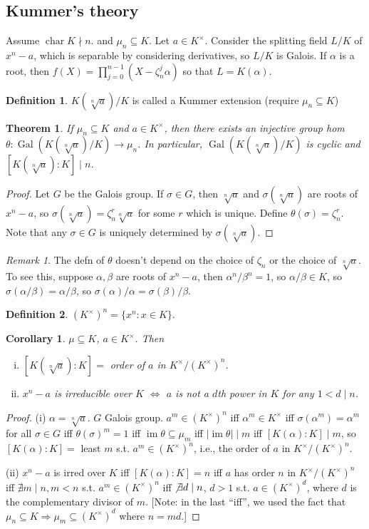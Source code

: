 \documentclass{article}
\theoremstyle{definition}
\newtheorem*{defn*}{Definition}
\theoremstyle{remark}
\newtheorem{rem}{Remark}
\theoremstyle{plain}
\newtheorem{thm}[defn]{Theorem}
\newtheorem{crly}[defn]{Corollary}
\newcommand{\Gal}{\operatorname{Gal}}
\begin{document}
\subsection{Kummer's theory}
Assume $\operatorname{char}K\nmid n$. and $\mu_n\subseteq K$. Let $a\in K^\times$. Consider the splitting field $L/K$ of $x^n-a$, which is separable by considering derivatives, so $L/K$ is Galois. If $\alpha$ is a root, then $f(X)=\prod_{j=0}^{n-1}(X-\zeta_n^j\alpha)$ so that $L=K(\alpha)$.
\begin{defn*}
    $K(\sqrt[n]a)/K$ is called a Kummer extension (require $\mu_n\subseteq K$)
\end{defn*}
\begin{thm}
    If $\mu_n\subseteq K$ and $a\in K^\times$, then there exists an injective group hom $\theta:\Gal(K(\sqrt[n]a)/K)\to\mu_n$. In particular, $\Gal(K(\sqrt[n]a)/K)$ is cyclic and $[K(\sqrt[n]a):K]\mid n$.
\end{thm}
\begin{proof}
    Let $G$ be the Galois group. If $\sigma\in G$, then $\sqrt[n]a$ and $\sigma(\sqrt[n]a)$ are roots of $x^n-a$, so $\sigma(\sqrt[n]a)=\zeta_n^r\sqrt[n]a$ for some $r$ which is unique. Define $\theta(\sigma)=\zeta_n^r$. Note that any $\sigma\in G$ is uniquely determined by $\sigma(\sqrt[n]a)$.
\end{proof}
\begin{rem}
    The defn of $\theta$ doesn't depend on the choice of $\zeta_n$ or the choice of $\sqrt[n]a$. To see this, suppose $\alpha,\beta$ are roots of $x^n-a$, then $\alpha^n/\beta^n=1$, so $\alpha/\beta\in K$, so $\sigma(\alpha/\beta)=\alpha/\beta$, so $\sigma(\alpha)/\alpha=\sigma(\beta)/\beta$.
\end{rem}
\begin{defn*}
    $(K^\times)^n=\{x^n:x\in K\}$.
\end{defn*}
\begin{crly}
    $\mu\subseteq K$, $a\in K^\times$. Then
    \begin{enumerate}[(i)]
        \item $[K(\sqrt[n]a):K]=$ order of $a$ in $K^\times/(K^\times)^n$.
        \item $x^n-a$ is irreducible over $K$ $\Leftrightarrow$ $a$ is not a $d$th power in $K$ for any $1<d\mid n$.
    \end{enumerate}
\end{crly}
\begin{proof}
    (i) $\alpha=\sqrt[n]a$. $G$ Galois group.
    $a^m\in (K^\times)^n$ iff $\alpha^m\in K^\times$ iff $\sigma(\alpha^m)=\alpha^m$ for all $\sigma\in G$ iff $\theta(\sigma)^m=1$ iff $\operatorname{im}\theta\subseteq\mu_m$ iff $|\operatorname{im}\theta|\mid m$ iff $[K(\alpha):K]\mid m$, so $[K(\alpha):K]=$ least $m$ s.t. $a^m\in (K^\times)^n$, i.e., the order of $a$ in $K^\times/(K^\times)^n$.

    (ii) $x^n-a$ is irred over $K$ iff $[K(\alpha):K]=n$ iff $a$ has order $n$ in $K^\times/(K^\times)^n$ iff $\nexists m\mid n, m<n$ s.t. $a^m\in (K^\times)^n$ iff $\not\exists d\mid n$, $d>1$ s.t. $a\in (K^\times)^d$, where $d$ is the complementary divisor of $m$.
    [Note: in the last ``iff'', we used the fact that $\mu_n\subseteq K\Rightarrow \mu_m\subseteq (K^\times )^d$ where $n=md$.]
\end{proof}
\end{document}
